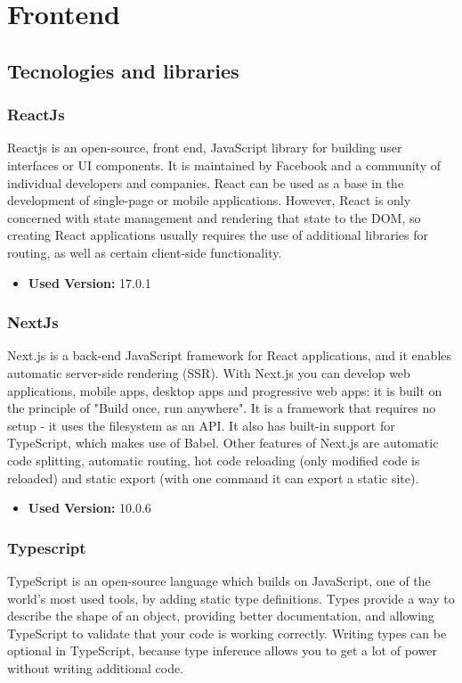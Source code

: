 \section{Frontend}

\subsection{Tecnologies and libraries}

\subsubsection{ReactJs}
Reactjs is an open-source, front end, JavaScript library for building user interfaces or UI components. It is maintained by Facebook and a community of individual developers and companies. React can be used as a base in the development of single-page or mobile applications. However, React is only concerned with state management and rendering that state to the DOM, so creating React applications usually requires the use of additional libraries for routing, as well as certain client-side functionality.

\begin{itemize}
    \item \textbf{Used Version:} 17.0.1 
\end{itemize}

\subsubsection{NextJs}
Next.js is a back-end JavaScript framework for React applications, and it enables automatic server-side rendering (SSR). With Next.js you can develop web applications, mobile apps, desktop apps and progressive web apps: it is built on the principle of "Build once, run anywhere". It is a framework that requires no setup - it uses the filesystem as an API. It also has built-in support for TypeScript, which makes use of Babel. Other features of Next.js are automatic code splitting, automatic routing, hot code reloading (only modified code is reloaded) and static export (with one command it can export a static site).

\begin{itemize}
    \item \textbf{Used Version:} 10.0.6 
\end{itemize}

\subsubsection{Typescript}
TypeScript is an open-source language which builds on JavaScript, one of the world’s most used tools, by adding static type definitions. Types provide a way to describe the shape of an object, providing better documentation, and allowing TypeScript to validate that your code is working correctly. Writing types can be optional in TypeScript, because type inference allows you to get a lot of power without writing additional code.

